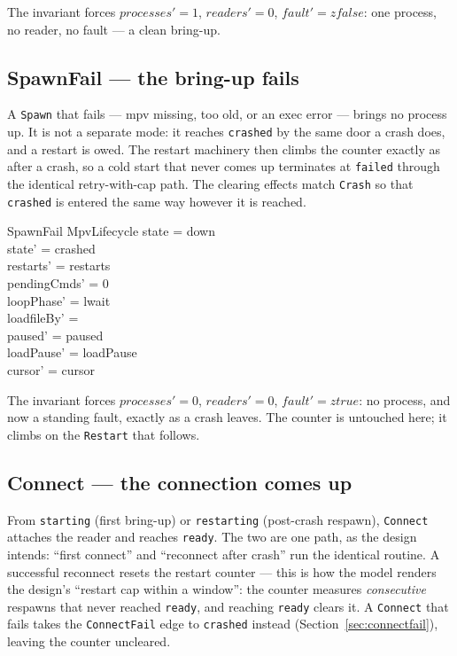 \documentclass[a4paper,10pt,fleqn]{article}
\begin{document}
The invariant forces $processes' = 1$, $readers' = 0$, $fault' = zfalse$: one
process, no reader, no fault --- a clean bring-up.

\subsection{SpawnFail --- the bring-up fails}
\label{sec:spawnfail}

A \texttt{Spawn} that fails --- mpv missing, too old, or an exec error --- brings
no process up. It is not a separate mode: it reaches \texttt{crashed} by the same
door a crash does, and a restart is owed. The restart machinery then climbs the
counter exactly as after a crash, so a cold start that never comes up terminates
at \texttt{failed} through the identical retry-with-cap path. The clearing
effects match \texttt{Crash} so that \texttt{crashed} is entered the same way
however it is reached.

\begin{schema}{SpawnFail}
  \Delta MpvLifecycle
  \where
  state = down \\
  state' = crashed \\
  restarts' = restarts \\
  pendingCmds' = 0 \\
  loopPhase' = lwait \\
  loadfileBy' = \emptyset \\
  paused' = paused \\
  loadPause' = loadPause \\
  cursor' = cursor
\end{schema}

The invariant forces $processes' = 0$, $readers' = 0$, $fault' = ztrue$: no
process, and now a standing fault, exactly as a crash leaves. The counter is
untouched here; it climbs on the \texttt{Restart} that follows.

\subsection{Connect --- the connection comes up}
\label{sec:connect}

From \texttt{starting} (first bring-up) or \texttt{restarting} (post-crash
respawn), \texttt{Connect} attaches the reader and reaches \texttt{ready}. The
two are one path, as the design intends: ``first connect'' and ``reconnect
after crash'' run the identical routine. A successful reconnect resets the
restart counter --- this is how the model renders the design's ``restart cap
within a window'': the counter measures \emph{consecutive} respawns that never
reached \texttt{ready}, and reaching \texttt{ready} clears it. A \texttt{Connect}
that fails takes the \texttt{ConnectFail} edge to \texttt{crashed} instead
(Section~\ref{sec:connectfail}), leaving the counter uncleared.
\end{document}
